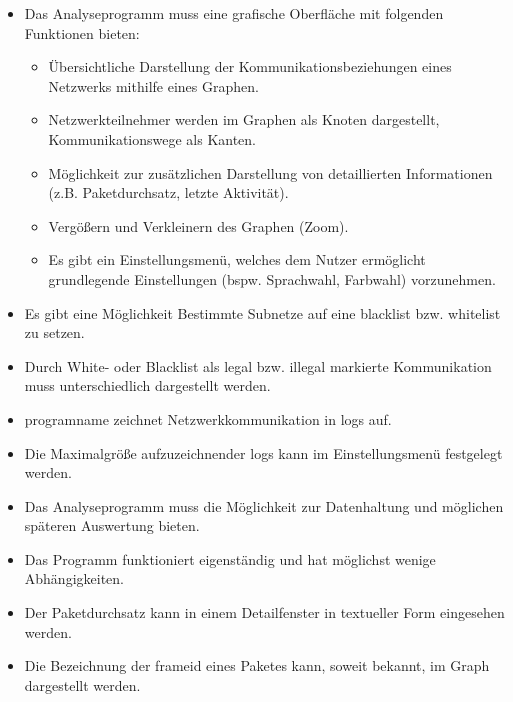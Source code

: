 \begin{itemize}
\item Das Analyseprogramm muss eine grafische Oberfläche mit folgenden Funktionen bieten:

	\begin{itemize}
    \item Übersichtliche Darstellung der Kommunikationsbeziehungen eines Netzwerks mithilfe eines Graphen.

    \item Netzwerkteilnehmer werden im Graphen als Knoten dargestellt, Kommunikationswege als Kanten.

    \item Möglichkeit zur zusätzlichen Darstellung von detaillierten Informationen (z.B. Paketdurchsatz, letzte Aktivität).

    \item Vergößern und Verkleinern des Graphen (Zoom).

    \item Es gibt ein Einstellungsmenü, welches dem Nutzer ermöglicht grundlegende Einstellungen (bspw. Sprachwahl, Farbwahl) vorzunehmen.
    \end{itemize}

\item Es gibt eine Möglichkeit Bestimmte Subnetze auf eine \gls{blacklist} bzw. \gls{whitelist} zu setzen.

\item Durch White- oder Blacklist als legal bzw. illegal markierte Kommunikation muss unterschiedlich dargestellt werden.

\item \gls{programname} zeichnet Netzwerkkommunikation in \glspl{log} auf.

\item Die Maximalgröße aufzuzeichnender \glspl{log} kann im Einstellungsmenü festgelegt werden.

\item Das Analyseprogramm muss die Möglichkeit zur Datenhaltung und möglichen späteren Auswertung bieten.

\item Das Programm funktioniert eigenständig und hat möglichst wenige Abhängigkeiten.

\item Der Paketdurchsatz kann in einem Detailfenster in textueller Form eingesehen werden.

\item Die Bezeichnung der \gls{frameid} eines Paketes kann, soweit bekannt, im Graph dargestellt werden.

\end{itemize}

